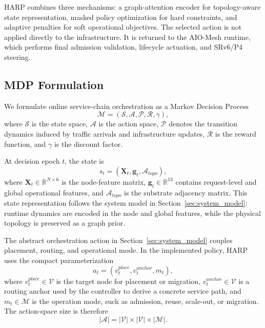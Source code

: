 \documentclass[final,5p]{elsarticle}
\begin{document}
HARP combines three mechanisms: a graph-attention encoder for topology-aware state representation, masked policy optimization for hard constraints, and adaptive penalties for soft operational objectives. The selected action is not applied directly to the infrastructure. It is returned to the AIO-Mesh runtime, which performs final admission validation, lifecycle actuation, and SRv6/P4 steering.

\subsection{MDP Formulation}
\label{subsec:harp_mdp}

We formulate online service-chain orchestration as a Markov Decision Process
\begin{equation}
    \mathcal{M}=(\mathcal{S},\mathcal{A},\mathcal{P},\mathcal{R},\gamma),
\end{equation}
where \(\mathcal{S}\) is the state space, \(\mathcal{A}\) is the action space, \(\mathcal{P}\) denotes the transition dynamics induced by traffic arrivals and infrastructure updates, \(\mathcal{R}\) is the reward function, and \(\gamma\) is the discount factor.

At decision epoch \(t\), the state is
\begin{equation}
    s_t=(\mathbf{X}_t,\mathbf{g}_t,\mathcal{A}_{topo}),
\end{equation}
where \(\mathbf{X}_t\in\mathbb{R}^{N\times 6}\) is the node-feature matrix, \(\mathbf{g}_t\in\mathbb{R}^{13}\) contains request-level and global operational features, and \(\mathcal{A}_{topo}\) is the substrate adjacency matrix. This state representation follows the system model in Section~\ref{sec:system_model}: runtime dynamics are encoded in the node and global features, while the physical topology is preserved as a graph prior.

The abstract orchestration action in Section~\ref{sec:system_model} couples placement, routing, and operational mode. In the implemented policy, HARP uses the compact parameterization
\begin{equation}
    a_t=(v_t^{place},v_t^{anchor},m_t),
\end{equation}
where \(v_t^{place}\in\mathcal{V}\) is the target node for placement or migration, \(v_t^{anchor}\in\mathcal{V}\) is a routing anchor used by the controller to derive a concrete service path, and \(m_t\in\mathcal{M}\) is the operation mode, such as admission, reuse, scale-out, or migration. The action-space size is therefore
\begin{equation}
    |\mathcal{A}|=|\mathcal{V}|\times|\mathcal{V}|\times|\mathcal{M}|.
\end{equation}
\end{document}
